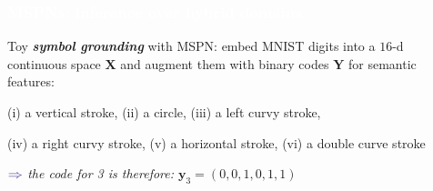\documentclass[xcolor={usenames,dvipsnames,svgnames}, compress]{beamer}
\newcommand{\highlighttext}[2][yellow]{{\colorbox{#1}{\textcolor{white}{#2}}}}
\begin{document}
\begin{frame}[t]
  \frametitle{\highlighttext[peas4]{MSPNs: inference over hybrid domains}}
  \footnotesize

      Toy \emph{\textbf{symbol grounding}} with MSPN: embed MNIST digits into a $16$-d
    continuous space $\mathbf{X}$ and augment them with binary codes $\mathbf{Y}$
    for semantic features:\par
\hspace{20pt}\begin{minipage}{0.9\linewidth}
  \vspace{2pt}
      \raggedright
(i) a vertical stroke,
(ii) a circle,
(iii) a left curvy stroke,\par
(iv) a right curvy stroke,
(v) a horizontal stroke,
(vi) a double curve stroke
\end{minipage}
\begin{minipage}{1.0\linewidth}
  \vspace{5pt}
      \raggedleft
      $\color{violet}\boldsymbol\Rightarrow$
      \scriptsize
 \emph{the code for 3 is therefore: $\mathbf{y}_{3}=(0,0,1,0,1,1)$}
\end{minipage}


  \begin{figure}[t]
  

\end{figure}
\end{frame}
\end{document}
